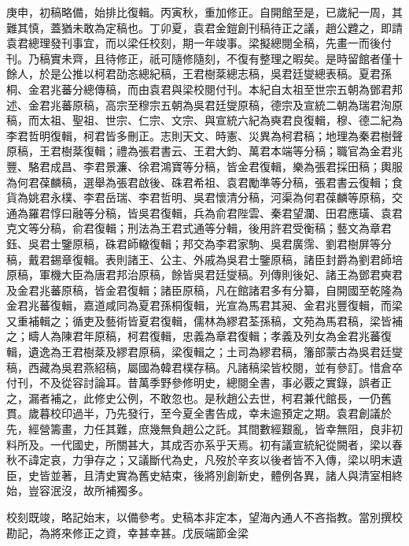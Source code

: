 \begin{pinyinscope}
庚申，初稿略備，始排比復輯。丙寅秋，重加修正。自開館至是，已歲紀一周，其難其慎，蓋猶未敢為定稿也。丁卯夏，袁君金鎧創刊稿待正之議，趙公韙之，即請袁君總理發刊事宜，而以梁任校刻，期一年竣事。梁擬總閱全稿，先畫一而後付刊。乃稿實未齊，且待修正，祇可隨修隨刻，不復有整理之暇矣。是時留館者僅十餘人，於是公推以柯君劭忞總紀稿，王君樹棻總志稿，吳君廷燮總表稿。夏君孫桐、金君兆蕃分總傳稿，而由袁君與梁校閱付刊。本紀自太祖至世宗五朝為鄧君邦述、金君兆蕃原稿，高宗至穆宗五朝為吳君廷燮原稿，德宗及宣統二朝為瑞君洵原稿，而太祖、聖祖、世宗、仁宗、文宗、與宣統六紀為奭君良復輯，穆、德二紀為李君哲明復輯，柯君皆多刪正。志則天文、時憲、災異為柯君稿；地理為秦君樹聲原稿，王君樹棻復輯；禮為張君書云、王君大鈞、萬君本端等分稿；職官為金君兆豐、駱君成昌、李君景濂、徐君鴻寶等分稿，皆金君復輯，樂為張君採田稿；輿服為何君葆麟稿，選舉為張君啟後、硃君希祖、袁君勵準等分稿，張君書云復輯；食貨為姚君永樸、李君岳瑞、李君哲明、吳君懷清分稿，河渠為何君葆麟等原稿，交通為羅君惇曰融等分稿，皆吳君復輯，兵為俞君陛雲、秦君望瀾、田君應璜、袁君克文等分稿，俞君復輯；刑法為王君式通等分輯，後用許君受衡稿；藝文為章君鈺、吳君士鑒原稿，硃君師轍復輯；邦交為李君家駒、吳君廣霈、劉君樹屏等分稿，戴君錫章復輯。表則諸王、公主、外戚為吳君士鑒原稿，諸臣封爵為劉君師培原稿，軍機大臣為唐君邦治原稿，餘皆吳君廷燮稿。列傳則後妃、諸王為鄧君奭君及金君兆蕃原稿，皆金君復輯；諸臣原稿，凡在館諸君多有分纂，自開國至乾隆為金君兆蕃復輯，嘉道咸同為夏君孫桐復輯，光宣為馬君其昶、金君兆豐復輯，而梁又重補輯之；循吏及藝術皆夏君復輯，儒林為繆君荃孫稿，文苑為馬君稿，梁皆補之；疇人為陳君年原稿，柯君復輯，忠義為章君復輯；孝義及列女為金君兆蕃復輯，遺逸為王君樹棻及繆君原稿，梁復輯之；土司為繆君稿，籓部蒙古為吳君廷燮稿，西藏為吳君燕紹稿，屬國為韓君樸存稿。凡諸稿梁皆校閱，並有參訂。惜倉卒付刊，不及從容討論耳。昔萬季野參修明史，總閱全書，事必覈之實錄，誤者正之，漏者補之，此修史公例，不敢忽也。是秋趙公去世，柯君兼代館長，一仍舊貫。歲暮校印過半，乃先發行，至今夏全書告成，幸未逾預定之期。袁君創議於先，經營籌畫，力任其難，庶幾無負趙公之託。其間數經艱亂，皆幸無阻，良非初料所及。一代國史，所關甚大，其成否亦系乎天焉。初有議宣統紀從闕者，梁以春秋不諱定哀，力爭存之；又議斷代為史，凡歿於辛亥以後者皆不入傳，梁以明末遺臣，史皆並著，且清史實為舊史結束，後將別創新史，體例各異，諸人與清室相終始，豈容泯沒，故所補獨多。

校刻既竣，略記始末，以備參考。史稿本非定本，望海內通人不吝指教。當別撰校勘記，為將來修正之資，幸甚幸甚。戊辰端節金梁


\end{pinyinscope}